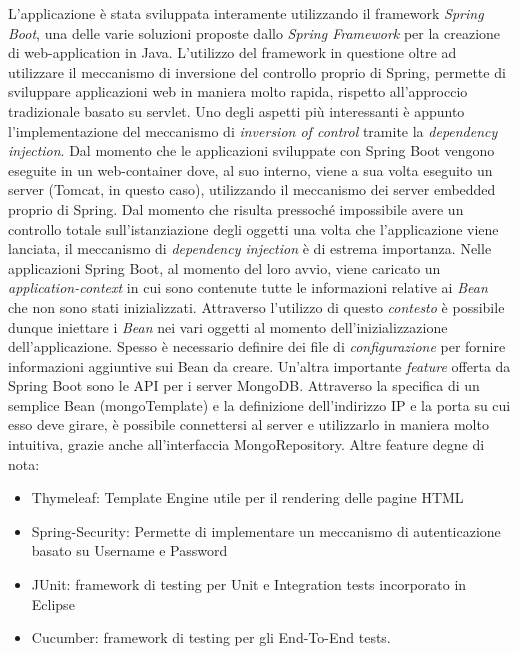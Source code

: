 L'applicazione è stata sviluppata interamente utilizzando il framework \textsl{Spring Boot}, una delle varie soluzioni proposte dallo \textsl{Spring Framework} per la creazione di web-application in Java.\newline
L'utilizzo del framework in questione oltre ad utilizzare il meccanismo di inversione del controllo proprio di Spring, permette di sviluppare applicazioni web in maniera molto rapida, rispetto all'approccio tradizionale basato su servlet.\newline\newline
Uno degli aspetti più interessanti è appunto l'implementazione del meccanismo di \textsl{inversion of control} tramite la \textsl{dependency injection}. Dal momento che le applicazioni sviluppate con Spring Boot vengono eseguite in un web-container dove, al suo interno, viene a sua volta eseguito un server (Tomcat, in questo caso), utilizzando il meccanismo dei server embedded proprio di Spring.\newline\newline
Dal momento che risulta pressoché impossibile avere un controllo totale sull'istanziazione degli oggetti una volta che l'applicazione viene lanciata, il meccanismo di \textsl{dependency injection} è di estrema importanza. Nelle applicazioni Spring Boot, al momento del loro avvio, viene caricato un \textsl{application-context} in cui sono contenute tutte le informazioni relative ai \textsl{Bean} che non sono stati inizializzati. Attraverso l'utilizzo di questo \textsl{contesto} è possibile dunque iniettare i \textsl{Bean} nei vari oggetti al momento dell'inizializzazione dell'applicazione. Spesso è necessario definire dei file di \textsl{configurazione} per fornire informazioni aggiuntive sui Bean da creare.
\newline\newline
Un'altra importante \textsl{feature} offerta da Spring Boot sono le API per i server MongoDB. Attraverso la specifica di un semplice Bean (mongoTemplate) e la definizione dell'indirizzo IP e la porta su cui esso deve girare, è possibile connettersi al server e utilizzarlo in maniera molto intuitiva, grazie anche all'interfaccia MongoRepository.\newline
Altre feature degne di nota:
\begin{itemize}
	\item Thymeleaf: Template Engine utile per il rendering delle pagine HTML
	\item Spring-Security: Permette di implementare un meccanismo di autenticazione basato su Username e Password
	\item JUnit: framework di testing per Unit e Integration tests incorporato in Eclipse
	\item Cucumber: framework di testing per gli End-To-End tests.
\end{itemize}

